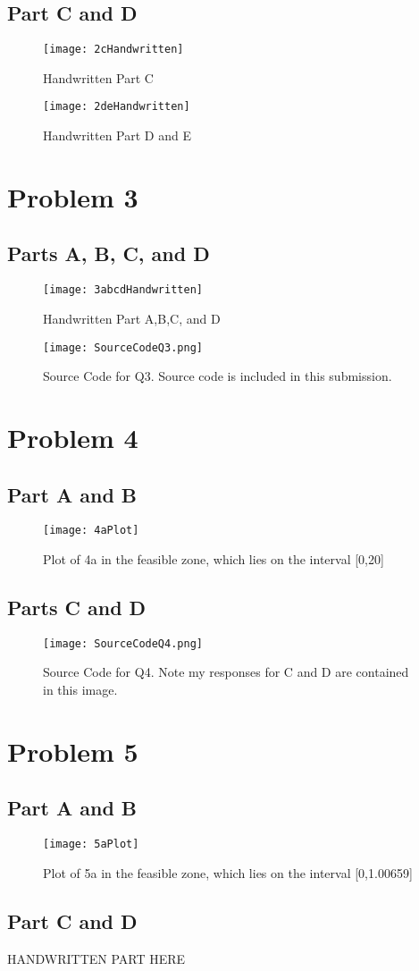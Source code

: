 \documentclass{article}
\numberwithin{equation}{section}
\begin{document}
\subsection{Part C and D}
\begin{figure}[hbt!]
\centering
\texttt{[image: 2cHandwritten]}
\caption{Handwritten Part C}
\end{figure}
\begin{figure}[hbt!]
\centering
\texttt{[image: 2deHandwritten]}
\caption{Handwritten Part D and E}
\end{figure}
\clearpage %
\section{Problem 3}
\subsection{Parts A, B, C, and D}
\begin{figure}[hbt!]
\centering
\texttt{[image: 3abcdHandwritten]}
\caption{Handwritten Part A,B,C, and D}
\end{figure}
\begin{figure}[hbt!]
\centering
\texttt{[image: SourceCodeQ3.png]}
\caption{Source Code for Q3. Source code is included in this submission.}
\end{figure}
\section{Problem 4}
\subsection{Part A and B}
\begin{figure}[hbt!]
\centering
\texttt{[image: 4aPlot]}
\caption{Plot of 4a in the feasible zone, which lies on the interval [0,20]}
\end{figure}
\clearpage
\subsection{Parts C and D}
\begin{figure}[hbt!]
\centering
\texttt{[image: SourceCodeQ4.png]}
\caption{Source Code for Q4. Note my responses for C and D are contained in this image.}
\end{figure}
\clearpage
\section{Problem 5}
\subsection{Part A and B}
\begin{figure}[hbt!]
\centering
\texttt{[image: 5aPlot]}
\caption{Plot of 5a in the feasible zone, which lies on the interval [0,1.00659]}
\end{figure}

\subsection{Part C and D}

HANDWRITTEN PART HERE
\end{document}
